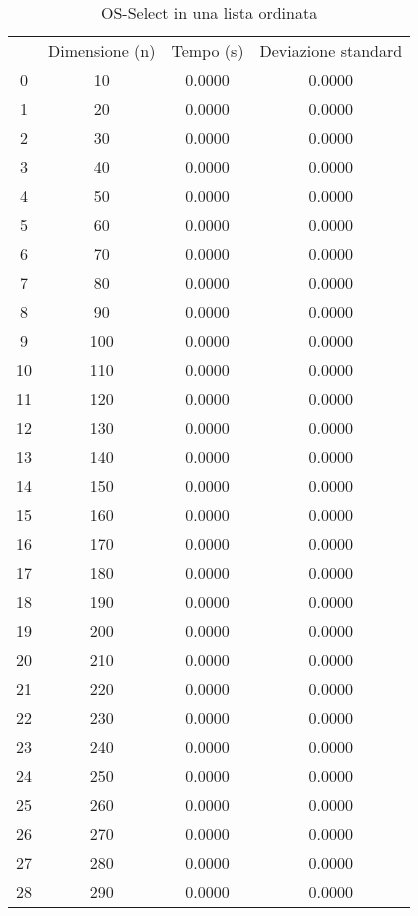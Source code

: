 \begin{table}[H]
\centering
\caption{OS-Select in una lista ordinata}
\label{OS-Select in una lista ordinata}
\begin{tabular}{cccc}
 & Dimensione (n) & Tempo (s) & Deviazione standard \\
0 & 10 & 0.0000 & 0.0000 \\
\cline{1-4}
1 & 20 & 0.0000 & 0.0000 \\
\cline{1-4}
2 & 30 & 0.0000 & 0.0000 \\
\cline{1-4}
3 & 40 & 0.0000 & 0.0000 \\
\cline{1-4}
4 & 50 & 0.0000 & 0.0000 \\
\cline{1-4}
5 & 60 & 0.0000 & 0.0000 \\
\cline{1-4}
6 & 70 & 0.0000 & 0.0000 \\
\cline{1-4}
7 & 80 & 0.0000 & 0.0000 \\
\cline{1-4}
8 & 90 & 0.0000 & 0.0000 \\
\cline{1-4}
9 & 100 & 0.0000 & 0.0000 \\
\cline{1-4}
10 & 110 & 0.0000 & 0.0000 \\
\cline{1-4}
11 & 120 & 0.0000 & 0.0000 \\
\cline{1-4}
12 & 130 & 0.0000 & 0.0000 \\
\cline{1-4}
13 & 140 & 0.0000 & 0.0000 \\
\cline{1-4}
14 & 150 & 0.0000 & 0.0000 \\
\cline{1-4}
15 & 160 & 0.0000 & 0.0000 \\
\cline{1-4}
16 & 170 & 0.0000 & 0.0000 \\
\cline{1-4}
17 & 180 & 0.0000 & 0.0000 \\
\cline{1-4}
18 & 190 & 0.0000 & 0.0000 \\
\cline{1-4}
19 & 200 & 0.0000 & 0.0000 \\
\cline{1-4}
20 & 210 & 0.0000 & 0.0000 \\
\cline{1-4}
21 & 220 & 0.0000 & 0.0000 \\
\cline{1-4}
22 & 230 & 0.0000 & 0.0000 \\
\cline{1-4}
23 & 240 & 0.0000 & 0.0000 \\
\cline{1-4}
24 & 250 & 0.0000 & 0.0000 \\
\cline{1-4}
25 & 260 & 0.0000 & 0.0000 \\
\cline{1-4}
26 & 270 & 0.0000 & 0.0000 \\
\cline{1-4}
27 & 280 & 0.0000 & 0.0000 \\
\cline{1-4}
28 & 290 & 0.0000 & 0.0000 \\

\end{tabular}
\end{table}
